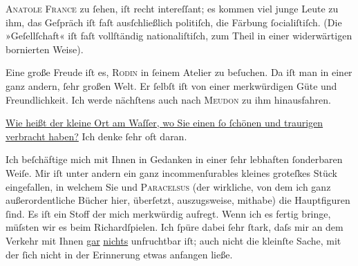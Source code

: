 \pstart
           \textsc{Anatole France} zu ſehen, iſt recht intereſſant; es kommen {\pb}viel junge Leute zu ihm, das
               Geſpräch iſt faſt ausſchließlich politiſch, die Färbung ſocialiſtiſch. (Die
               »Geſellſchaft« iſt faſt vollſtändig nationaliſtiſch, zum Theil in einer widerwärtigen
               bornierten Weise).\pend
           
\pstart
           Eine große Freude iſt es, \textsc{Rodin} in ſeinem Atelier zu beſuchen. Da iſt man in einer ganz andern, ſehr großen
               Welt. Er ſelbſt iſt von einer merkwürdigen Güte und Freundlichkeit. Ich {\pb}werde  nächſtens auch nach \textsc{Meudon} zu ihm hinausfahren.\pend
           
\pstart
           \uline{Wie heißt der kleine Ort am Waſſer, wo Sie einen ſo ſchönen und traurigen
                     \label{K_L01021-1v}\label{K_L01021-1} verbracht haben?} Ich denke ſehr oft daran.\pend
           
\pstart
           Ich beſchäftige mich mit Ihnen in Gedanken in einer ſehr lebhaften ſonderbaren Weiſe.
               Mir iſt unter andern ein ganz incommenſurables kleines groteſkes Stück eingefallen, in welchem Sie und \textsc{Paracelsus} (der wirkliche, von dem ich ganz {\pb}außerordentliche Bücher hier,
               überſetzt, auszugsweise, mithabe) die Hauptfiguren ſind. Es iſt ein Stoff der mich
               merkwürdig aufregt. Wenn ich es fertig bringe, müſsten wir es beim Richardſpielen. Ich ſpüre dabei ſehr ſtark, daſs mir an
               dem Verkehr mit Ihnen \uline{gar}{ }\uline{nichts} unfruchtbar iſt; auch nicht die kleinſte
               Sache, mit der ſich nicht in der {\pb}Erinnerung etwas anfangen ließe.\pend
           

